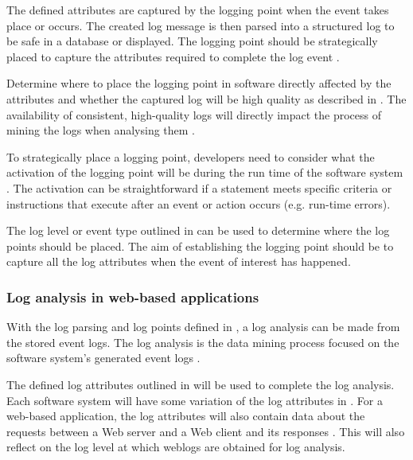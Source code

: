 The defined attributes are captured by the logging point when the event takes place or occurs. The created log message is then parsed into a structured log to be safe in a database or displayed. The logging point should be strategically placed to capture the attributes required to complete the log event \cite{Fedaghi2010}.\par Determine where to place the logging point in software directly affected by the attributes and whether the captured log will be high quality as described in . The availability of consistent, high-quality logs will directly impact the process of mining the logs when analysing them \cite{Kherbouche2017}. \par To strategically place a logging point, developers need to consider what the activation of the logging point will be during the run time of the software system \cite{Pecchia2015, Cinque2013}. The activation can be straightforward if a statement meets specific criteria or instructions that execute after an event or action occurs (e.g. run-time errors). \par The log level or event type outlined in  can be used to determine where the log points should be placed. The aim of establishing the logging point should be to capture all the log attributes when the event of interest has happened.

\subsubsection{Log analysis in web-based applications}
With the log parsing and log points defined in , a log analysis can be made from the stored event logs. The log analysis is the data mining process focused on the software system's generated event logs \cite{Slaninova2014,Hasiloglu2018}. \par The defined log attributes outlined in  will be used to complete the log analysis. Each software system will have some variation of the log attributes in . For a web-based application, the log attributes will also contain data about the requests between a Web server and a Web client and its responses \cite{Slaninova2014, Dhanalakshmi2016}. This will also reflect on the log level at which weblogs are obtained for log analysis.



